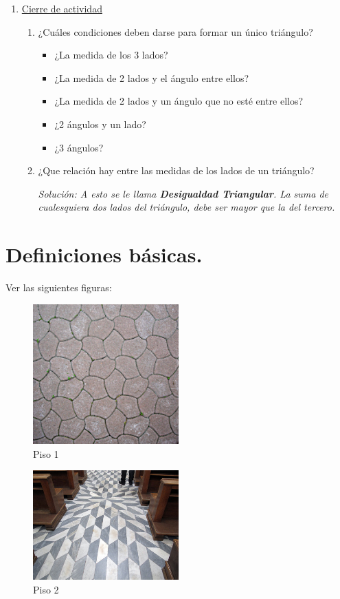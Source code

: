 \begin{enumerate}
	\item \underline{Cierre de actividad}
	\begin{enumerate}
		\item ¿Cuáles condiciones deben darse para formar un único triángulo?
		\begin{itemize}
			\item ¿La medida de los 3 lados?
			\item ¿La medida de 2 lados y el ángulo entre ellos?
			\item ¿La medida de 2 lados y un ángulo que no esté entre ellos?
			\item ¿2 ángulos y un lado?
			\item ¿3 ángulos?
		\end{itemize}
		\item ¿Que relación hay entre las medidas de los lados de un triángulo?
		
		\textit{Solución: A esto se le llama \textbf{Desigualdad Triangular}. La suma de cualesquiera dos lados del triángulo, debe ser mayor que la del tercero.}
	\end{enumerate}
	
	
\end{enumerate}
\section{Definiciones básicas.}\label{definiciones.basicas.congruencias}
Ver las siguientes figuras:

\begin{figure}[H]
	\centering
	\includegraphics[width=0.5\textwidth]{Geometria/imgs/congruencia_piso.jpg} 
	\caption{Piso 1}
	\label{congurncia.figura.1}
\end{figure}

\begin{figure}[H]
	\centering
	\includegraphics[width=0.5\textwidth]{Geometria/imgs/congruencia_piso_2.JPG}
	\caption{Piso 2}
	\label{congurncia.figura.2}
\end{figure}

